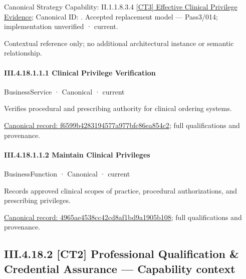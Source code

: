 {\small Canonical Strategy Capability: II.1.1.8.3.4 \hyperref[element:addeadbd69fe470198b32c563f476f75]{[CT3] Effective Clinical Privilege Evidence}; Canonical ID: \texttt{}. Accepted replacement model — Pass3/014; implementation unverified · current.}\par
Contextual reference only; no additional architectural instance or semantic relationship.\par
\paragraph*{III.4.18.1.1.1 Clinical Privilege Verification}
\label{navigation:III.4.18.1.1.1}

\label{element:f6599b4283194577a977bfc86ea854c2}
{\small BusinessService · Canonical · current}\par

Verifies procedural and prescribing authority for clinical ordering systems.


{\footnotesize \href{../../../../../../../../continuum/business/business-service/f6599b4283194577a977bfc86ea854c2.md}{Canonical record: f6599b4283194577a977bfc86ea854c2}; full qualifications and provenance.}\par
\paragraph*{III.4.18.1.1.2 Maintain Clinical Privileges}
\label{navigation:III.4.18.1.1.2}

\label{element:4965ae4538cc42cd8af1bd9a1905b108}
{\small BusinessFunction · Canonical · current}\par

Records approved clinical scopes of practice, procedural authorizations, and prescribing privileges.


{\footnotesize \href{../../../../../../../../continuum/business/business-function/4965ae4538cc42cd8af1bd9a1905b108.md}{Canonical record: 4965ae4538cc42cd8af1bd9a1905b108}; full qualifications and provenance.}\par
\subsection*{III.4.18.2 [CT2] Professional Qualification \& Credential Assurance — Capability context}
\label{navigation:III.4.18.2}


